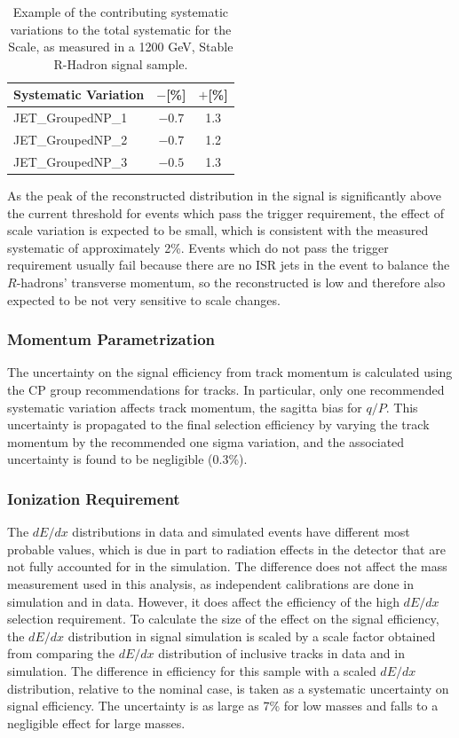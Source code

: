 \begin{table}
  \begin{center}
  \begin{tabular}{lcc}
  \hline
  Systematic Variation & $-$[\%]& $+$[\%] \\
  \hline
  JET\_GroupedNP\_1 & $-0.7$ & 1.3\\
  JET\_GroupedNP\_2 & $-0.7$ & 1.2\\
  JET\_GroupedNP\_3 & $-0.5$ & 1.3\\
  \hline
  \end{tabular}
  \end{center}
  \caption{Example of the contributing systematic variations to the total systematic for the \met Scale, as measured in a 1200 GeV, Stable R-Hadron signal sample.}
  \label{tab:met_syst_contributions}
\end{table}

As the peak of the reconstructed \met distribution in the signal is significantly above the current threshold for events which pass the trigger requirement, the effect of scale variation is expected to be small, which is consistent with the measured systematic of approximately 2\%. Events which do not pass the trigger requirement usually fail because there are no ISR jets in the event to balance the $R$-hadrons' transverse momentum, so the reconstructed \met is low and therefore also expected to be not very sensitive to scale changes.

\subsubsection{Momentum Parametrization}
The uncertainty on the signal efficiency from track momentum is calculated using the \ac{CP} group recommendations for tracks. 
In particular, only one recommended systematic variation affects track momentum, the sagitta bias for $q/P$. 
This uncertainty is propagated to the final selection efficiency by varying the track momentum by the recommended one sigma variation, and the associated uncertainty is found to be negligible (0.3\%). 

\subsubsection{Ionization Requirement}
The $dE/dx$ distributions in data and simulated events have different most probable values, which is due in part to radiation effects in the detector that are not fully accounted for in the simulation. 
The difference does not affect the mass measurement used in this analysis, as independent calibrations are done in simulation and in data. 
However, it does affect the efficiency of the high $dE/dx$ selection requirement. 
To calculate the size of the effect on the signal efficiency, the $dE/dx$ distribution in signal simulation is scaled by a scale factor obtained from comparing the $dE/dx$ distribution of inclusive tracks in data and in simulation. 
The difference in efficiency for this sample with a scaled $dE/dx$ distribution, relative to the nominal case, is taken as a systematic uncertainty on signal efficiency.
The uncertainty is as large as 7\% for low masses and falls to a negligible effect for large masses. 

